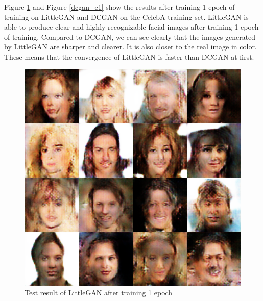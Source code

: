 Figure \ref{littlegan_e1} and Figure \ref{dcgan_e1} show the results after training 1 epoch of training on LittleGAN and DCGAN on the CelebA training set.
LittleGAN is able to produce clear and highly recognizable facial images after training 1 epoch of training.
Compared to DCGAN, we can see clearly that the images generated by LittleGAN are sharper and clearer.
It is also closer to the real image in color.
These means that the convergence of LittleGAN is faster than DCGAN at first.

    \begin{figure}
        \begin{minipage}[t]{0.48\linewidth}
            \centering
            \includegraphics[width=\textwidth]{figures/result_littlegan_e1.png}
            \caption{Test result of LittleGAN after training 1 epoch}
            \label{littlegan_e1}
        \end{minipage}
            \hfill
        \begin{minipage}[t]{0.48\linewidth}
            \centering

\end{minipage}
\end{figure}
